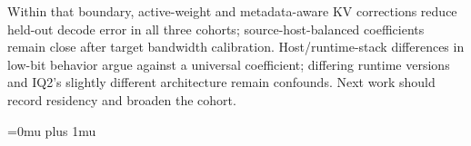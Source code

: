 \documentclass{article}
\begin{document}
Within that boundary, active-weight and metadata-aware KV corrections reduce
held-out decode error in all three cohorts; source-host-balanced coefficients
remain close after target bandwidth calibration.  Host/runtime-stack differences
in low-bit behavior argue against a universal coefficient; differing runtime
versions and IQ2's slightly different architecture remain confounds.  Next work
should record residency and broaden the cohort.

\clearpage
\setlength{\emergencystretch}{1.5em}
\Urlmuskip=0mu plus 1mu
\balance


\end{document}
